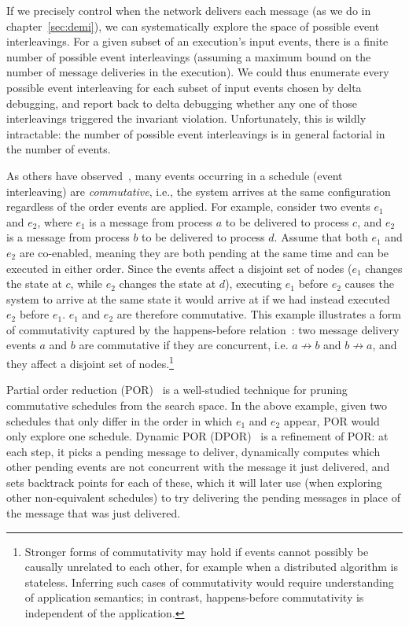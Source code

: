 If we precisely control when the network delivers each message (as we do in
chapter~\ref{sec:demi}), we can
systematically explore the space of possible event interleavings.
For a given subset of an execution's input events, there is a finite number of
possible event interleavings (assuming a maximum bound on the number of
message deliveries in the execution). We could thus enumerate every possible
event interleaving for each subset of input events chosen by delta debugging,
and report back to delta debugging whether any one of those interleavings
triggered the invariant violation. Unfortunately, this is wildly intractable: the
number of possible event interleavings is in general factorial in the number
of events.

As others have observed~\cite{godefroid1995partial}, many events occurring in
a schedule (event interleaving) are {\em commutative}, i.e., the system arrives at the same
configuration regardless of the order events are applied. For example, consider two events $e_1$ and $e_2$, where
$e_1$ is a message from process $a$ to be delivered to
process $c$, and $e_2$ is a message from process $b$
to be delivered to process $d$. Assume that both $e_1$ and $e_2$ are co-enabled, meaning they are both pending at the same time and can be executed in either order. Since
the events affect a disjoint set of nodes ($e_1$ changes the state at $c$, while $e_2$ changes the state at $d$), executing $e_1$ before $e_2$ causes the system to arrive at the same state it would arrive at if we had instead executed $e_2$ before $e_1$.
$e_1$ and $e_2$ are therefore commutative. This example
illustrates a form of commutativity captured by the happens-before relation~\cite{Lamport:1978:TCO:359545.359563}: two message delivery events
$a$ and $b$ are commutative if they are concurrent, i.e. $a \not\rightarrow b$
and $b \not\rightarrow a$, and they affect a disjoint set of nodes.\footnote{
Stronger forms of
commutativity may hold if events cannot possibly be causally unrelated to each other, for
example when a distributed algorithm is stateless. Inferring such cases of
commutativity would require understanding of application semantics; in
contrast, happens-before commutativity is independent of the application.}

Partial order reduction (POR)~\cite{godefroid1995partial,flanagan2005dynamic} is a well-studied technique for pruning commutative schedules from the search space. In the above example, given two schedules that only differ in the order
in which $e_1$ and $e_2$ appear, POR would only explore one schedule. Dynamic POR (DPOR)~\cite{flanagan2005dynamic} is a
refinement of POR: at each
step, it picks a pending message to deliver, dynamically computes which
other pending events are not concurrent with the message it just delivered,
and sets backtrack points for each of these, which it will later use (when
exploring other non-equivalent schedules) to try delivering the pending
messages in place of the message that was just delivered.

